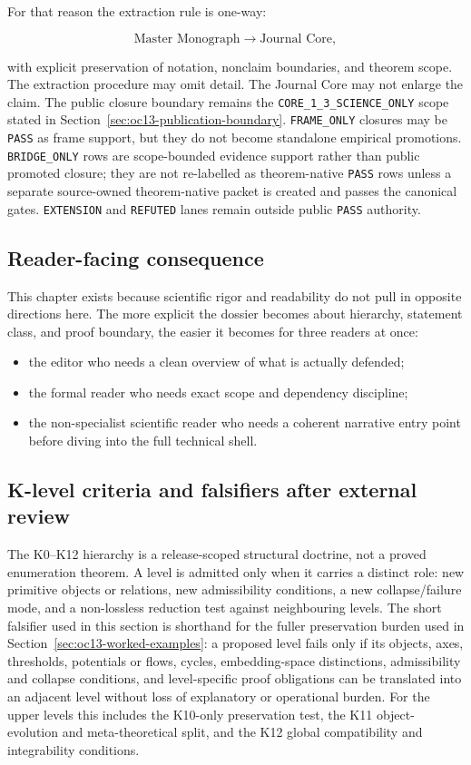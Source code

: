 For that reason the extraction rule is one-way:

\[
\text{Master Monograph} \longrightarrow \text{Journal Core},
\]

with explicit preservation of notation, nonclaim boundaries, and theorem scope.
The extraction procedure may omit detail. The Journal Core may not enlarge the
claim.
The public closure boundary remains the
\texttt{CORE\_1\_3\_SCIENCE\_ONLY} scope stated in
Section~\ref{sec:oc13-publication-boundary}. \texttt{FRAME\_ONLY} closures
may be \texttt{PASS} as frame support, but they do not become standalone
empirical promotions. \texttt{BRIDGE\_ONLY} rows are scope-bounded evidence
support rather than public promoted closure; they are not re-labelled as
theorem-native \texttt{PASS} rows unless a separate source-owned
theorem-native packet is created and passes the canonical gates. \texttt{EXTENSION} and
\texttt{REFUTED} lanes remain outside public \texttt{PASS} authority.

\subsection{Reader-facing consequence}

This chapter exists because scientific rigor and readability do not pull in
opposite directions here.
The more explicit the dossier becomes about hierarchy, statement class, and
proof boundary, the easier it becomes for three readers at once:

\begin{itemize}
\item the editor who needs a clean overview of what is actually defended;
\item the formal reader who needs exact scope and dependency discipline;
\item the non-specialist scientific reader who needs a coherent narrative entry
      point before diving into the full technical shell.
\end{itemize}


\subsection{K-level criteria and falsifiers after external review}
\label{sec:oc13-k-level-criteria-v3}

The K0--K12 hierarchy is a release-scoped structural doctrine, not a proved
enumeration theorem. A level is admitted only when it carries a distinct role:
new primitive objects or relations, new admissibility conditions, a new
collapse/failure mode, and a non-lossless reduction test against neighbouring
levels. The short falsifier used in this section is shorthand for the fuller
preservation burden used in Section~\ref{sec:oc13-worked-examples}: a proposed
level fails only if its objects, axes, thresholds, potentials or flows, cycles,
embedding-space distinctions, admissibility and collapse conditions, and
level-specific proof obligations can be translated into an adjacent level
without loss of explanatory or operational burden.  For the upper levels this
includes the K10-only preservation test, the K11 object-evolution and
meta-theoretical split, and the K12 global compatibility and integrability
conditions.

